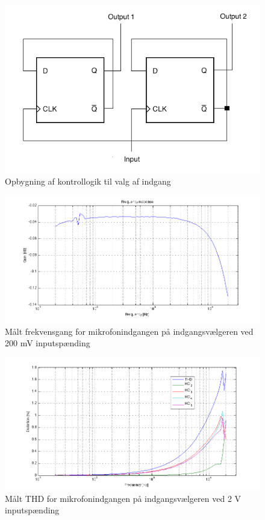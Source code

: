 \begin{frame}

\begin{figure}[h]
\centering
\includegraphics[scale=0.4]{../rapport/teknisk/indgangsvaelger/flipflop.png}
\caption{Opbygning af kontrollogik til valg af indgang}
\label{fig:indgangsvaelger-flipflop}
\end{figure}
\end{frame}

\begin{frame}
\begin{figure}[h]
\centering
\includegraphics[width=\textwidth]{../rapport/maalerapporter/indgangsvaelger/Indgangsvlger-mic-200mv-frek.png}
\caption{Målt frekvensgang for mikrofonindgangen på indgangsvælgeren ved 200 mV inputspænding}
\label{fig:indacc:frek200mv}
\end{figure}
\end{frame}

\begin{frame}
\begin{figure}[h]
\centering
\includegraphics[width=\textwidth]{../rapport/maalerapporter/indgangsvaelger/Indgangsvlger-mic-2v-thd.png}
\caption{Målt THD for mikrofonindgangen på indgangsvælgeren ved 2 V inputspænding}
\label{fig:accind:thd2v}
\end{figure}
\end{frame}

